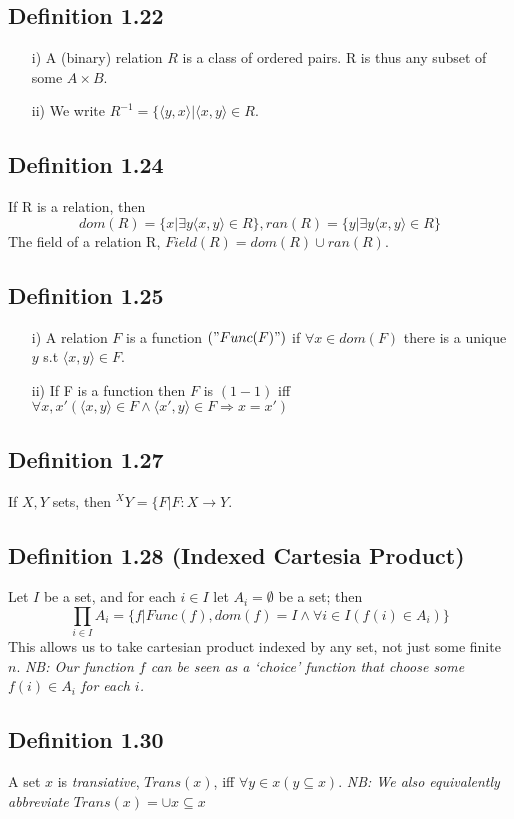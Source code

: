 \documentclass[a4paper, 12pt, twoside]{article}
\begin{document}
\subsection*{Definition 1.22}
\begin{itemize}
    \item[i)] A (binary) relation $R$ is a class of ordered pairs. R is thus any subset of some $A\times B$.
    \item[ii)] We write $R^{-1}=\{\langle y,x\rangle|\langle x,y\rangle\in R$.
\end{itemize}
\subsection*{Definition 1.24}
If R is a relation, then
$$dom(R)=\{x|\exists y \langle x,y\rangle \in R\},ran(R)=\{y|\exists y \langle x,y\rangle \in R\}$$
The field of a relation R, $ Field(R)=dom(R)\cup ran(R)$.
\subsection*{Definition 1.25}
\begin{itemize}
    \item[i)] A relation $F$ is a function $("Func(F)")$ if $\forall x \in dom(F)$ there is a unique $y$ s.t $\langle x,y\rangle \in F$.
    \item[ii)] If F is a function then $F$ is $(1-1)$ iff $\forall x,x'(\langle x,y\rangle\in F\wedge \langle x',y\rangle\in F \Rightarrow x=x')$
\end{itemize}
\subsection*{Definition 1.27}
If $X,Y$ sets, then $^{X}Y=\{F|F:X\to Y$.
\subsection*{Definition 1.28 (Indexed Cartesia Product)}
Let $I$ be a set, and for each $i\in I$ let $A_{i}=\emptyset$ be a set; then
$$\prod_{i\in I}A_{i}=\{f|Func(f),dom(f)=I\wedge\forall i\in I(f(i)\in A_{i})\}$$
This allows us to take cartesian product indexed by any set, not just some finite $n$.
\textit{NB: Our function $f$ can be seen as a `choice' function that choose some $f(i)\in A_{i}$ for each $i$.}
\subsection*{Definition 1.30}
A set $x$ is \emph{transiative}, $Trans(x)$, iff $\forall y\in x(y\subseteq x)$.
\textit{NB:  We also equivalently abbreviate $Trans(x)=\cup x\subseteq x$}
\end{document}
